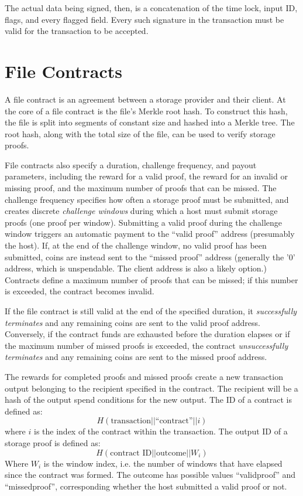 \documentclass[twocolumn]{article}
\begin{document}
The actual data being signed, then, is a concatenation of the time lock, input ID, flags, and every flagged field.
Every such signature in the transaction must be valid for the transaction to be accepted.

\section{File Contracts}
\label{sec:contracts}
A file contract is an agreement between a storage provider and their client.
At the core of a file contract is the file's Merkle root hash.
To construct this hash, the file is split into segments of constant size and hashed into a Merkle tree.
The root hash, along with the total size of the file, can be used to verify storage proofs.

File contracts also specify a duration, challenge frequency, and payout parameters, including the reward for a valid proof, the reward for an invalid or missing proof, and the maximum number of proofs that can be missed.
The challenge frequency specifies how often a storage proof must be submitted, and creates discrete \textit{challenge windows} during which a host must submit storage proofs (one proof per window).
Submitting a valid proof during the challenge window triggers an automatic payment to the ``valid proof'' address (presumably the host).
If, at the end of the challenge window, no valid proof has been submitted, coins are instead sent to the ``missed proof'' address (generally the '0' address, which is unspendable. The client address is also a likely option.)
Contracts define a maximum number of proofs that can be missed; if this number is exceeded, the contract becomes invalid.

If the file contract is still valid at the end of the specified duration, it \textit{successfully terminates} and any remaining coins are sent to the valid proof address.
Conversely, if the contract funds are exhausted before the duration elapses or if the maximum number of missed proofs is exceeded, the contract \textit{unsuccessfully terminates} and any remaining coins are sent to the missed proof address.

The rewards for completed proofs and missed proofs create a new transaction output belonging to the recipient specified in the contract.
The recipient will be a hash of the output spend conditions for the new output.
The ID of a contract is defined as:
\[
	H(\text{transaction} || \text{``contract''} || i)
\]
where $i$ is the index of the contract within the transaction.
The output ID of a storage proof is defined as:
\[
	H(\text{contract ID} || \text{outcome} || W_i)
\]
Where $W_i$ is the window index, i.e. the number of windows that have elapsed since the contract was formed.
The outcome has possible values ``validproof'' and ``missedproof'', corresponding whether the host submitted a valid proof or not.
\end{document}
